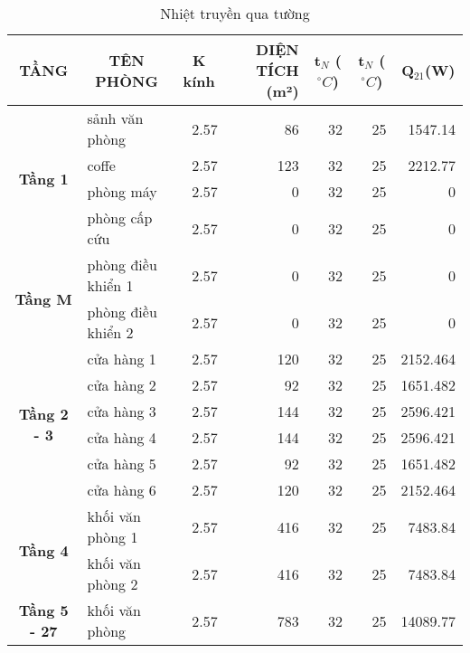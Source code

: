 \begin{table}[H]
	\vspace{-1cm}
	\centering
	\caption{Nhiệt truyền qua tường}
	\begin{adjustbox}{width=\textwidth}
	\begin{tabular}{|c|l|r|r|r|r|r|}
		\hline
		\textbf{ TẦNG} & \multicolumn{1}{c|}{\textbf{TÊN PHÒNG}} & \multicolumn{1}{c|}{\textbf{K kính}} & \multicolumn{1}{p{6.145em}|}{\textbf{DIỆN TÍCH (m²) }} & \multicolumn{1}{c|}{\textbf{t$_{N}$ ($^{\circ}C$)}} & \multicolumn{1}{c|}{\textbf{t$_{N}$ ($^{\circ}C$)}} & \multicolumn{1}{c|}{\textbf{Q$_{21}$(W)}} \bigstrut\\
		\hline
		\multirow{4}[8]{*}{\textbf{Tầng 1}} & sảnh văn phòng & 2.57  & 86    & 32    & 25    & 1547.14 \bigstrut\\
		\cline{2-7}          & coffe & 2.57  & 123   & 32    & 25    & 2212.77 \bigstrut\\
		\cline{2-7}          & phòng máy & 2.57  & 0     & 32    & 25    & 0 \bigstrut\\
		\cline{2-7}          & phòng cấp cứu & 2.57  & 0     & 32    & 25    & 0 \bigstrut\\
		\hline
		\multirow{2}[4]{*}{\textbf{Tầng M}} & phòng điều khiển 1 & 2.57  & 0     & 32    & 25    & 0 \bigstrut\\
		\cline{2-7}          & phòng điều khiển 2 & 2.57  & 0     & 32    & 25    & 0 \bigstrut\\
		\hline
		\multirow{6}[12]{*}{\textbf{Tầng 2 - 3}} & cửa hàng 1 & 2.57  & 120   & 32    & 25    & 2152.464 \bigstrut\\
		\cline{2-7}          & cửa hàng 2 & 2.57  & 92    & 32    & 25    & 1651.482 \bigstrut\\
		\cline{2-7}          & cửa hàng 3 & 2.57  & 144   & 32    & 25    & 2596.421 \bigstrut\\
		\cline{2-7}          & cửa hàng 4 & 2.57  & 144   & 32    & 25    & 2596.421 \bigstrut\\
		\cline{2-7}          & cửa hàng 5 & 2.57  & 92    & 32    & 25    & 1651.482 \bigstrut\\
		\cline{2-7}          & cửa hàng 6 & 2.57  & 120   & 32    & 25    & 2152.464 \bigstrut\\
		\hline
		\multirow{2}[4]{*}{\textbf{Tầng 4}} & khối văn phòng 1 & 2.57  & 416   & 32    & 25    & 7483.84 \bigstrut\\
		\cline{2-7}          & khối văn phòng 2 & 2.57  & 416   & 32    & 25    & 7483.84 \bigstrut\\
		\hline
		\textbf{Tầng 5 - 27} & khối văn phòng & 2.57  & 783   & 32    & 25    & 14089.77 \bigstrut\\
		\hline
	\end{tabular}%
	\end{adjustbox}
	\label{b:ntqvt}%
\end{table}%

